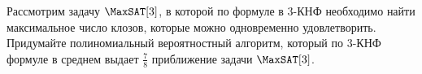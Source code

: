 Рассмотрим задачу $\MaxSAT[3]$, в которой по формуле в $3$-КНФ необходимо найти максимальное число клозов,
которые можно одновременно удовлетворить. Придумайте полиномиальный вероятностный алгоритм, который по
$3$-КНФ формуле в среднем выдает $\frac{7}{8}$ приближение задачи $\MaxSAT[3]$.